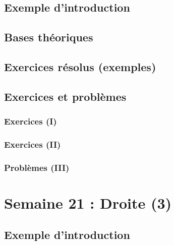 \documentclass[
  12pt,
]{book}
\begin{document}
\hypertarget{exemple-dintroduction-19}{%
\section{Exemple d'introduction}\label{exemple-dintroduction-19}}

\hypertarget{bases-thuxe9oriques-19}{%
\section{Bases théoriques}\label{bases-thuxe9oriques-19}}

\hypertarget{exercices-ruxe9solus-exemples-19}{%
\section{Exercices résolus (exemples)}\label{exercices-ruxe9solus-exemples-19}}

\hypertarget{exercices-et-probluxe8mes-19}{%
\section{Exercices et problèmes}\label{exercices-et-probluxe8mes-19}}

\hypertarget{exercices-i-19}{%
\subsection{Exercices (I)}\label{exercices-i-19}}

\hypertarget{exercices-ii-19}{%
\subsection{Exercices (II)}\label{exercices-ii-19}}

\hypertarget{probluxe8mes-iii-19}{%
\subsection{Problèmes (III)}\label{probluxe8mes-iii-19}}

\hypertarget{semaine-21-droite-3}{%
\chapter{Semaine 21 : Droite (3)}\label{semaine-21-droite-3}}

\hypertarget{exemple-dintroduction-20}{%
\section{Exemple d'introduction}\label{exemple-dintroduction-20}}
\end{document}
